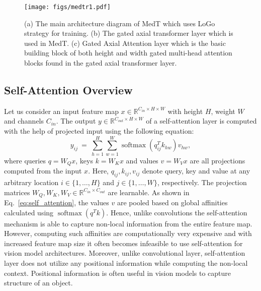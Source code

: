 \documentclass[runningheads]{llncs}
\begin{document}
	


	\begin{figure}[b!]
		\centering
		\texttt{[image: figs/medtr1.pdf]}\\
		\vskip -12.5pt
		\caption{ (a) The main architecture diagram of MedT which uses LoGo strategy for training. (b) The gated axial transformer layer which is used in MedT. (c) Gated Axial Attention layer which is the basic building block of both height and width gated multi-head attention blocks found in the gated axial transformer layer. }
		
		\label{medt}
	\end{figure}


	\subsection{Self-Attention Overview}


	Let us consider an input feature map $x \in \mathbb{R}^{C_{in} \times H \times W}$ with height $H$, weight $W$ and channels $C_{in}$. The output $y \in \mathbb{R}^{C_{out} \times H \times W}$ of a self-attention layer is computed with the help of projected input using the following equation:
	\begin{equation}\label{eq:self_attention}
	y_{ij} \ = \ \sum_{h=1}^{H} \sum_{w=1}^{W} \operatorname{softmax} \left(q_{ij}^{T} k_{hw}\right) v_{hw},
	\end{equation}
	where queries $q=W_Q x$, keys $k=W_K x$ and values $v=W_V x$ are all projections computed from the input $x$. Here, $q_{ij}, k_{ij}, v_{ij}$ denote query, key and value at any arbitrary location $i \in \{1, \dots, H\}$ and $j \in \{1, \dots, W\}$, respectively. The projection matrices $W_Q, W_K, W_V \in \mathbb{R}^{C_{in} \times C_{out}}$ are learnable. As shown in Eq.~\ref{eq:self_attention}, the values $v$ are pooled based on global affinities calculated using $\operatorname{softmax} (q^T k)$. Hence, unlike convolutions the self-attention mechanism is able to capture non-local information from the entire feature map. However, computing such affinities are computationally very expensive and with increased feature map size it often becomes infeasible to use self-attention for vision model architectures. Moreover, unlike convolutional layer, self-attention layer does not utilize any positional information while computing the non-local context. Positional information is often useful in vision models to capture structure of an object.
	
\end{document}
